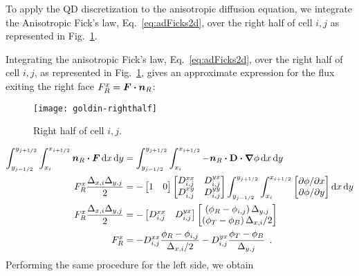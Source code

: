To apply the QD discretization to the anisotropic diffusion equation,
we integrate the Anisotropic Fick's law, Eq.~\eqref{eq:adFicks2d}, over the
right half of cell $i,j$ as represented in Fig.~\ref{fig:goldinRight}.

Integrating the anisotropic Fick's law, Eq.~\eqref{eq:adFicks2d}, over the right
half of cell $i,j$, as represented in Fig.~\ref{fig:goldinRight}, gives an
approximate expression for the flux exiting the right face $F_R^x =
\bm{F}\bm{\cdot}\bm{n}_R$:
%
\begin{figure}[tb]
  \centering
  \texttt{[image: goldin-righthalf]}
  \caption{Right half of cell $i,j$.}
  \label{fig:goldinRight}
\end{figure}
%
\begin{align*}
\int_{y_{j-1/2}}^{y_{j+1/2}} \int_{x_{i}}^{x_{i+1/2}}
\bm{n}_R \bm{\cdot} \bm{F}
\mathop{}\!\mathrm{d} x \mathop{}\!\mathrm{d} y
&=
\int_{y_{j-1/2}}^{y_{j+1/2}} \int_{x_{i}}^{x_{i+1/2}}
-\bm{n}_R \bm{\cdot} \mathbf{D} \bm{\cdot} \bm{\nabla} \phi
\mathop{}\!\mathrm{d} x \mathop{}\!\mathrm{d} y
\\
F_R^x \frac{\Delta_{x,i} \Delta_{y,j}}{2}
&=
-
\begin{bmatrix}
  1 & 0
\end{bmatrix}
\begin{bmatrix}
  D_{i,j}^{xx} & D_{i,j}^{yx} \\
  D_{i,j}^{xy} & D_{i,j}^{yy}
\end{bmatrix}
\int_{y_{j-1/2}}^{y_{j+1/2}} \int_{x_{i}}^{x_{i+1/2}}
\begin{bmatrix}
  {\partial \phi}/{\partial x} \\
  {\partial \phi}/{\partial y}
\end{bmatrix}
\mathop{}\!\mathrm{d} x \mathop{}\!\mathrm{d} y
\\
F_R^x \frac{\Delta_{x,i} \Delta_{y,j}}{2}
&=
-
\begin{bmatrix}
  D_{i,j}^{xx} & D_{i,j}^{yx}
\end{bmatrix}
\begin{bmatrix}
  \left( \phi_R - \phi_{i,j} \right) \Delta_{y,j} \\
  \left( \phi_T - \phi_B \right) \Delta_{x,i} / 2
\end{bmatrix}
\\
F_R^x
&= 
- D_{i,j}^{xx} \frac{\phi_R - \phi_{i,j}}{ \Delta_{x,i} / 2}
- D_{i,j}^{yx} \frac{\phi_T - \phi_B}{ \Delta_{y,j} }\ \,.
\end{align*}
Performing the same procedure for the left side, we obtain
